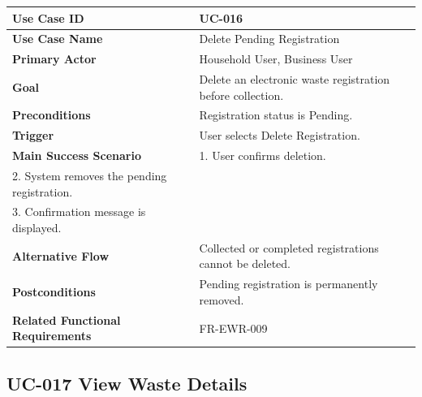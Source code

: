 \begin{longtable}{|p{4cm}|p{10cm}|}

\hline
\textbf{Use Case ID} &
UC-016 \\
\hline

\textbf{Use Case Name} &
Delete Pending Registration \\
\hline

\textbf{Primary Actor} &
Household User, Business User \\
\hline

\textbf{Goal} &
Delete an electronic waste registration before collection. \\
\hline

\textbf{Preconditions} &
Registration status is Pending. \\
\hline

\textbf{Trigger} &
User selects Delete Registration. \\
\hline

\textbf{Main Success Scenario} &
1. User confirms deletion.\\
2. System removes the pending registration.\\
3. Confirmation message is displayed.\\
\hline

\textbf{Alternative Flow} &
Collected or completed registrations cannot be deleted.\\
\hline

\textbf{Postconditions} &
Pending registration is permanently removed.\\
\hline

\textbf{Related Functional Requirements} &
FR-EWR-009 \\
\hline

\end{longtable}

\subsection{UC-017 View Waste Details}

